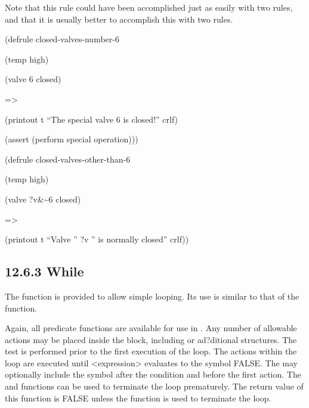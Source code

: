 \documentclass[letterpaper,10pt,english]{sphinxmanual}
\begin{document}
Note that this rule could have been accomplished just as easily with two
rules, and that it is usually better to accomplish this with two rules.

\begin{DUlineblock}{0em}
\item[] (defrule closed-valves-number-6
\item[] (temp high)
\item[] (valve 6 closed)
\item[] =\textgreater{}
\item[] (printout t “The special valve 6 is closed!” crlf)
\item[] (assert (perform special operation)))
\end{DUlineblock}

\begin{DUlineblock}{0em}
\item[] (defrule closed-valves-other-than-6
\item[] (temp high)
\item[] (valve ?v\&\textasciitilde{}6 closed)
\item[] =\textgreater{}
\item[] (printout t “Valve ” ?v ” is normally closed” crlf))
\end{DUlineblock}


\subsection{12.6.3 While}
\label{\detokenize{actions:while}}
The  function is provided to allow simple looping. Its use is
similar to that of the  function.


\begin{sphinxVerbatim}[commandchars=\\\{\}]
   \PYG{p}{[}\PYG{p}{]}
 
\end{sphinxVerbatim}

Again, all predicate functions are available for use in . Any
number of allowable actions may be placed inside the  block,
including  or ad?ditional  structures. The
test is performed prior to the first execution of the loop. The actions
within the  loop are executed until \textless{}expression\textgreater{} evaluates to
the symbol FALSE. The  may optionally include the symbol 
after the condition and before the first action. The  and
 functions can be used to terminate the loop prematurely. The
return value of this function is FALSE unless the  function is
used to terminate the loop.
\end{document}
